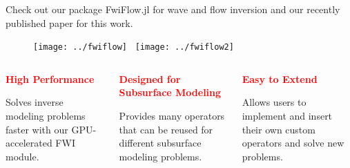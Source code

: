 \documentclass[usenames,dvipsnames]{beamer}
\begin{document}
\begin{frame}
	
	Check out our package FwiFlow.jl for wave and flow inversion and our recently published paper for this work. 
	
	\begin{figure}
	\centering
	\texttt{[image: ../fwiflow]}~
	\texttt{[image: ../fwiflow2]}
\end{figure}

\begin{columns}
	\centering
	\begin{column}{0.33\textwidth}
		\begin{center}
			\textcolor{red}{\textbf{High Performance}}
		\end{center}
	Solves inverse modeling problems faster with our GPU-accelerated FWI module. 
	\end{column}
		\begin{column}{0.33\textwidth}
		\begin{center}
			\textcolor{red}{\textbf{Designed for Subsurface Modeling}}
		\end{center}
	Provides many operators that can be reused for different subsurface modeling problems. 
	\end{column}
	\begin{column}{0.33\textwidth}
			\begin{center}
		\textcolor{red}{\textbf{Easy to Extend}}
		\end{center}
		Allows users to implement and insert their own custom operators and solve new problems.
	\end{column}

\end{columns}

\end{frame}

\newcommand{\bsigma}[0]{\bm{\sigma}}
\newcommand{\bepsilon}[0]{\bm{\epsilon}}
\end{document}
